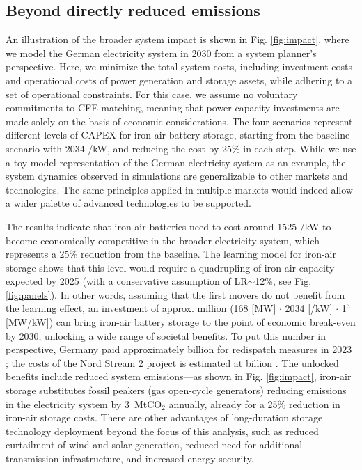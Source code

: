 \documentclass[pdflatex,sn-basic, Numbered]{sn-jnl}
\theoremstyle{thmstyleone}%
\theoremstyle{thmstyletwo}%
\theoremstyle{thmstylethree}%
\begin{document}
\subsection*{Beyond directly reduced emissions}\label{sec4}

An illustration of the broader system impact is shown in Fig. \ref{fig:impact}, where we model the German electricity system in 2030 from a system planner's perspective. Here, we minimize the total system costs, including investment costs and operational costs of power generation and storage assets, while adhering to a set of operational constraints. For this case, we assume no voluntary commitments to CFE matching, meaning that power capacity investments are made solely on the basis of economic considerations. The four scenarios represent different levels of CAPEX for iron-air battery storage, starting from the baseline scenario with 2034 \officialeuro/kW, and reducing the cost by 25\% in each step. While we use a toy model representation of the German electricity system as an example, the system dynamics observed in simulations are generalizable to other markets and technologies. The same principles applied in multiple markets would indeed allow a wider palette of advanced technologies to be supported.

The results indicate that iron-air batteries need to cost around 1525 \officialeuro/kW to become economically competitive in the broader electricity system, which represents a 25\% reduction from the baseline. The learning model for iron-air storage shows that this level would require a quadrupling of iron-air capacity expected by 2025 (with a conservative assumption of LR$\sim$12\%, see Fig. \ref{fig:panels}). In other words, assuming that the first movers do not benefit from the learning effect, an investment of approx.  million (168 [MW] $\cdot$ 2034 [\officialeuro/kW] $\cdot$ 1$^3$ [MW/kW]) can bring iron-air battery storage to the point of economic break-even by 2030, unlocking a wide range of societal benefits. To put this number in perspective, Germany paid approximately  billion for redispatch measures in 2023 \cite{ bnetzaBundesnetzagenturMonitoringberichte2023}; the  costs of the Nord Stream 2 project is estimated at  billion \cite{cleanenergywireNordStreamSymbol2018}. The unlocked benefits include reduced system emissions---as shown in Fig. \ref{fig:impact}, iron-air storage substitutes fossil peakers (gas open-cycle generators) reducing emissions in the electricity system by 3~MtCO$_2$ annually, already for a 25\% reduction in iron-air storage costs. There are other advantages of long-duration storage technology deployment beyond the focus of this analysis, such as reduced curtailment of wind and solar generation, reduced need for additional transmission infrastructure, and increased energy security.
\end{document}
